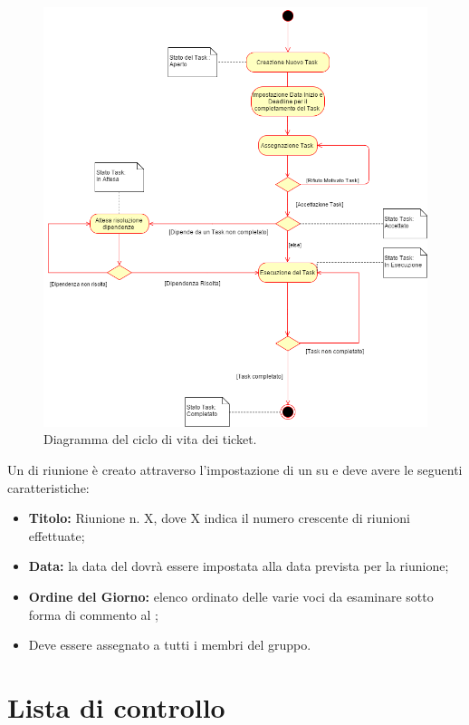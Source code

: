 \documentclass[12pt,a4paper]{article}
\begin{document}
\begin{center}
	\begin{figure}[H]
		\centering
		\label{f1-TicketCicloVita}
		\includegraphics[scale=0.6]{TicketCicloVita.png}
		\caption{Diagramma del ciclo di vita dei ticket.}
	\end{figure}
\end{center}

\label{ticketRiunione}
Un  di riunione è creato attraverso l'impostazione di un  su  e deve avere le seguenti caratteristiche:
\begin{itemize}
	\item \textbf{Titolo:} Riunione n. X, dove X indica il numero crescente di riunioni effettuate;
	\item \textbf{Data:} la data del  dovrà essere impostata alla data prevista per la riunione;
	\item \textbf{Ordine del Giorno:} elenco ordinato delle varie voci da esaminare sotto forma di commento al ;
	\item Deve essere assegnato a tutti i membri del gruppo.
\end{itemize}

\newpage

\appendix
\section{Lista di controllo}

\newpage
\printglossary[title={Glossario}]
\end{document}
